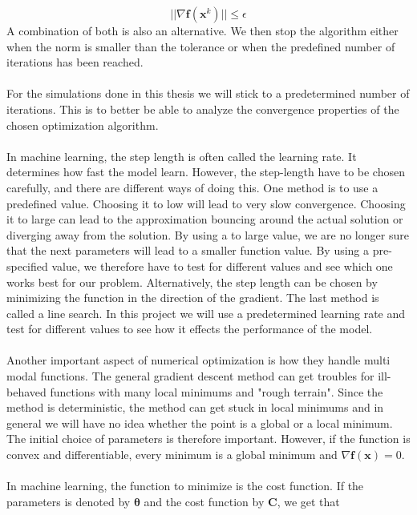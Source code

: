 \begin{equation}
    ||\nabla \boldsymbol{f}(\boldsymbol{x}^k)|| \leq \epsilon
\end{equation}
A combination of both is also an alternative. We then stop the algorithm either when the norm is smaller than the tolerance or when the predefined number of iterations has been reached.
\\
\\
For the simulations done in this thesis we will stick to a predetermined number of iterations. This is to better be able to analyze the convergence properties of the chosen optimization algorithm. 
\\
\\
In machine learning, the step length is often called the learning rate. It determines how fast the model learn. However, the step-length have to be chosen carefully, and there are different ways of doing this. One method is to use a predefined value. Choosing it to low will lead to very slow convergence. Choosing it to large can lead to the approximation bouncing around the actual solution or diverging away from the solution. By using a to large value, we are no longer sure that the next parameters will lead to a smaller function value.  By using a pre-specified value, we therefore have to test for different values and see which one works best for our problem. Alternatively, the step length can be chosen by minimizing the function in the direction of the gradient. The last method is called a line search. In this project we will use a predetermined learning rate and test for different values to see how it effects the performance of the model. 
\\
\\
Another important aspect of numerical optimization is how they handle multi modal functions. The general gradient descent method can get troubles for ill-behaved functions with many local minimums and "rough terrain". Since the method is deterministic, the method can get stuck in local minimums and in general we will have no idea whether the point is a global or a local minimum. The initial choice of parameters is therefore important. However, if the function is convex and differentiable, every minimum is a global minimum and $\nabla \boldsymbol{f}(\boldsymbol{x}) = 0$.\cite{NumOpt} 
\\
\\
In machine learning, the function to minimize is the cost function. If the parameters is denoted by $\boldsymbol{\theta}$ and the cost function by $\boldsymbol{C}$, we get that 
